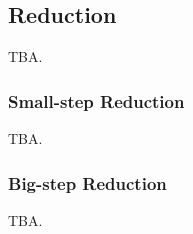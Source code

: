 \begin{prooftree}
\end{prooftree}

\begin{prooftree}
\end{prooftree}

\subsection{Reduction}

TBA.

\subsubsection{Small-step Reduction}

TBA.

\subsubsection{Big-step Reduction}

TBA.